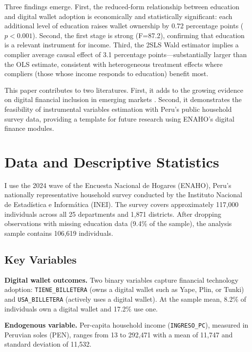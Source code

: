 \documentclass[12pt,a4paper]{article}
\begin{document}
Three findings emerge. First, the reduced-form relationship between education
and digital wallet adoption is economically and statistically significant: each
additional level of education raises wallet ownership by 0.72 percentage points
($p < 0.001$). Second, the first stage is strong (F=87.2), confirming that
education is a relevant instrument for income. Third, the 2SLS Wald estimator
implies a complier average causal effect of 3.1 percentage points---substantially
larger than the OLS estimate, consistent with heterogeneous treatment effects
where compliers (those whose income responds to education) benefit most.

This paper contributes to two literatures. First, it adds to the growing
evidence on digital financial inclusion in emerging markets
\citep{jack2016, suri2021}. Second, it demonstrates the feasibility of
instrumental variables estimation with Peru's public household survey data,
providing a template for future research using ENAHO's digital finance modules.

\section{Data and Descriptive Statistics}
\label{sec:data}

I use the 2024 wave of the Encuesta Nacional de Hogares (ENAHO), Peru's
nationally representative household survey conducted by the Instituto Nacional
de Estad\'istica e Inform\'atica (INEI). The survey covers approximately 117,000
individuals across all 25 departments and 1,871 districts. After dropping
observations with missing education data (9.4\% of the sample), the analysis
sample contains 106,619 individuals.

\subsection{Key Variables}

\textbf{Digital wallet outcomes.} Two binary variables capture financial
technology adoption: \texttt{TIENE\_BILLETERA} (owns a digital wallet such as
Yape, Plin, or Tunki) and \texttt{USA\_BILLETERA} (actively uses a digital
wallet). At the sample mean, 8.2\% of individuals own a digital wallet and
17.2\% use one.

\textbf{Endogenous variable.} Per-capita household income (\texttt{INGRESO\_PC}),
measured in Peruvian soles (PEN), ranges from 13 to 292,471 with a mean of
11,747 and standard deviation of 11,532.
\end{document}
